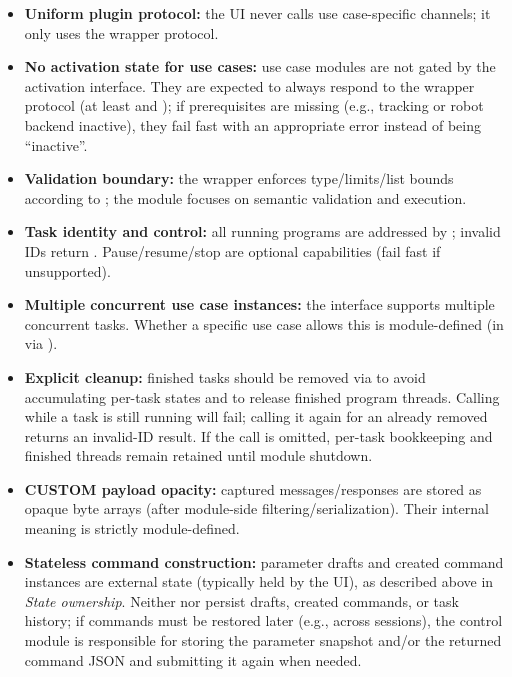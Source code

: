 \begin{itemize}
    \item \textbf{Uniform plugin protocol:} the UI never calls use case-specific channels; it only uses the wrapper protocol.
    \item \textbf{No activation state for use cases:} use case modules are not gated by the activation interface. They are expected to always respond to the wrapper protocol (at least  and ); if prerequisites are missing (e.g., tracking or robot backend inactive), they fail fast with an appropriate error instead of being ``inactive''.
    \item \textbf{Validation boundary:} the wrapper enforces type/limits/list bounds according to ; the module focuses on semantic validation and execution.
    \item \textbf{Task identity and control:} all running programs are addressed by ; invalid IDs return . Pause/resume/stop are optional capabilities (fail fast if unsupported).
    \item \textbf{Multiple concurrent use case instances:} the interface supports multiple concurrent tasks. Whether a specific use case allows this is module-defined (in  via ).
    \item \textbf{Explicit cleanup:} finished tasks should be removed via  to avoid accumulating per-task states and to release finished program threads. Calling  while a task is still running will fail; calling it again for an already removed  returns an invalid-ID result. If the call is omitted, per-task bookkeeping and finished threads remain retained until module shutdown.
    \item \textbf{CUSTOM payload opacity:} captured messages/responses are stored as opaque byte arrays (after module-side filtering/serialization). Their internal meaning is strictly module-defined.
    \item \textbf{Stateless command construction:} parameter drafts and created command instances are external state (typically held by the UI), as described above in \emph{State ownership}. Neither  nor  persist drafts, created commands, or task history; if commands must be restored later (e.g., across sessions), the control module is responsible for storing the parameter snapshot and/or the returned command JSON and submitting it again when needed.
\end{itemize}





